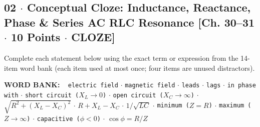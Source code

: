 \documentclass[10pt,letterpaper]{article}
\begin{document}
\newpage



\subsection*{02 $\cdot$ Conceptual Cloze: Inductance, Reactance, Phase \& Series AC RLC Resonance \hfill [Ch. 30--31 $\cdot$ 10 Points $\cdot$ CLOZE]}

Complete each statement below using the exact term or expression from the 14-item word bank (each item used at most once; four items are unused distractors).


  \textbf{WORD BANK:} ~
  \texttt{electric field} $\cdot$
  \texttt{magnetic field} $\cdot$
  \texttt{leads} $\cdot$
  \texttt{lags} $\cdot$
  \texttt{in phase with} $\cdot$
  \texttt{short circuit ($X_L \to 0$)} $\cdot$
  \texttt{open circuit ($X_C \to \infty$)} $\cdot$
  \texttt{$\sqrt{R^2 + (X_L - X_C)^2}$} $\cdot$
  \texttt{$R + X_L - X_C$} $\cdot$
  \texttt{$1/\sqrt{LC}$} $\cdot$
  \texttt{minimum ($Z = R$)} $\cdot$
  \texttt{maximum ($Z \to \infty$)} $\cdot$
  \texttt{capacitive ($\phi < 0$)} $\cdot$
  \texttt{$\cos\phi = R/Z$}
\end{document}
